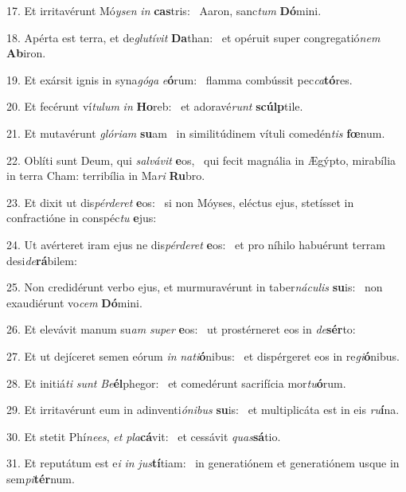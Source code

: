 17. Et irritavérunt Mó\textit{y}\textit{sen} \textit{in} \textbf{cas}tris: \ast\  Aaron, sanc\textit{tum} \textbf{Dó}mini.\

18. Apérta est terra, et de\textit{glu}\textit{tí}\textit{vit} \textbf{Da}than: \ast\  et opéruit super congregatió\textit{nem} \textbf{Ab}iron.\

19. Et exársit ignis in syna\textit{gó}\textit{ga} \textit{e}\textbf{ó}rum: \ast\  flamma combússit pec\textit{ca}\textbf{tó}res.\

20. Et fecérunt ví\textit{tu}\textit{lum} \textit{in} \textbf{Ho}reb: \ast\  et adoravé\textit{runt} \textbf{scúlp}tile.\

21. Et mutavérunt \textit{gló}\textit{ri}\textit{am} \textbf{su}am \ast\  in similitúdinem vítuli comedén\textit{tis} \textbf{fœ}num.\

22. Oblíti sunt Deum, qui \textit{sal}\textit{vá}\textit{vit} \textbf{e}os, \ast\  qui fecit magnália in Ægýpto, mirabília in terra Cham: terribília in Ma\textit{ri} \textbf{Ru}bro.\

23. Et dixit ut dis\textit{pér}\textit{de}\textit{ret} \textbf{e}os: \ast\  si non Móyses, eléctus ejus, stetísset in confractióne in conspéc\textit{tu} \textbf{e}jus:\

24. Ut avérteret iram ejus ne dis\textit{pér}\textit{de}\textit{ret} \textbf{e}os: \ast\  et pro níhilo habuérunt terram desi\textit{de}\textbf{rá}bilem:\

25. Non credidérunt verbo ejus, et murmuravérunt in taber\textit{ná}\textit{cu}\textit{lis} \textbf{su}is: \ast\  non exaudiérunt vo\textit{cem} \textbf{Dó}mini.\

26. Et elevávit manum su\textit{am} \textit{su}\textit{per} \textbf{e}os: \ast\  ut prostérneret eos in \textit{de}\textbf{sér}to:\

27. Et ut dejíceret semen eórum \textit{in} \textit{na}\textit{ti}\textbf{ó}nibus: \ast\  et dispérgeret eos in re\textit{gi}\textbf{ó}nibus.\

28. Et initiá\textit{ti} \textit{sunt} \textit{Be}\textbf{él}phegor: \ast\  et comedérunt sacrifícia mor\textit{tu}\textbf{ó}rum.\

29. Et irritavérunt eum in adinventi\textit{ó}\textit{ni}\textit{bus} \textbf{su}is: \ast\  et multiplicáta est in eis \textit{ru}\textbf{í}na.\

30. Et stetit Phí\textit{nees}, \textit{et} \textit{pla}\textbf{cá}vit: \ast\  et cessávit \textit{quas}\textbf{sá}tio.\

31. Et reputátum est e\textit{i} \textit{in} \textit{jus}\textbf{tí}tiam: \ast\  in generatiónem et generatiónem usque in sem\textit{pi}\textbf{tér}num.\

